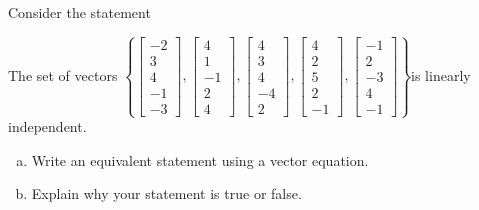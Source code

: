 
\begin{exerciseStatement}


Consider the statement 
\begin{center}\begin{minipage}{0.8\textwidth}
 The set of vectors \( \left\{ \left[\begin{array}{c}
-2 \\
3 \\
4 \\
-1 \\
-3
\end{array}\right] , \left[\begin{array}{c}
4 \\
1 \\
-1 \\
2 \\
4
\end{array}\right] , \left[\begin{array}{c}
4 \\
3 \\
4 \\
-4 \\
2
\end{array}\right] , \left[\begin{array}{c}
4 \\
2 \\
5 \\
2 \\
-1
\end{array}\right] , \left[\begin{array}{c}
-1 \\
2 \\
-3 \\
4 \\
-1
\end{array}\right] \right\} \)is linearly independent.
\end{minipage}\end{center}
    


\begin{enumerate}[(a)]
\item  Write an equivalent statement using a vector equation.
\item  Explain why your statement is true or false.
\end{enumerate}
    
\end{exerciseStatement}
    
